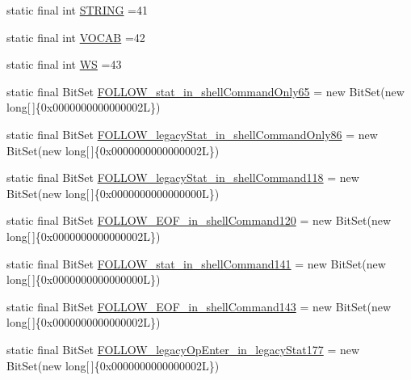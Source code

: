 \begin{DoxyCompactItemize}
\item 
static final int \hyperlink{classorg_1_1tzi_1_1use_1_1parser_1_1shell_1_1_shell_command_parser_a70f508f209903ea40e4a4db856532fbb}{S\-T\-R\-I\-N\-G} =41
\item 
static final int \hyperlink{classorg_1_1tzi_1_1use_1_1parser_1_1shell_1_1_shell_command_parser_a9ed513409bb5891111a4e8a40efe9fd0}{V\-O\-C\-A\-B} =42
\item 
static final int \hyperlink{classorg_1_1tzi_1_1use_1_1parser_1_1shell_1_1_shell_command_parser_ad1eb7f196e278698295abb130df5dfbe}{W\-S} =43
\item 
static final Bit\-Set \hyperlink{classorg_1_1tzi_1_1use_1_1parser_1_1shell_1_1_shell_command_parser_aa08586710d36bfb31548a1ab3a64ded7}{F\-O\-L\-L\-O\-W\-\_\-stat\-\_\-in\-\_\-shell\-Command\-Only65} = new Bit\-Set(new long\mbox{[}$\,$\mbox{]}\{0x0000000000000002\-L\})
\item 
static final Bit\-Set \hyperlink{classorg_1_1tzi_1_1use_1_1parser_1_1shell_1_1_shell_command_parser_a1e89ba05af7b3128bc0543138a00b9cc}{F\-O\-L\-L\-O\-W\-\_\-legacy\-Stat\-\_\-in\-\_\-shell\-Command\-Only86} = new Bit\-Set(new long\mbox{[}$\,$\mbox{]}\{0x0000000000000002\-L\})
\item 
static final Bit\-Set \hyperlink{classorg_1_1tzi_1_1use_1_1parser_1_1shell_1_1_shell_command_parser_ab569dae83257ad267233023bb8d452f1}{F\-O\-L\-L\-O\-W\-\_\-legacy\-Stat\-\_\-in\-\_\-shell\-Command118} = new Bit\-Set(new long\mbox{[}$\,$\mbox{]}\{0x0000000000000000\-L\})
\item 
static final Bit\-Set \hyperlink{classorg_1_1tzi_1_1use_1_1parser_1_1shell_1_1_shell_command_parser_adbcc648cdebed6c184bbb054c49141cb}{F\-O\-L\-L\-O\-W\-\_\-\-E\-O\-F\-\_\-in\-\_\-shell\-Command120} = new Bit\-Set(new long\mbox{[}$\,$\mbox{]}\{0x0000000000000002\-L\})
\item 
static final Bit\-Set \hyperlink{classorg_1_1tzi_1_1use_1_1parser_1_1shell_1_1_shell_command_parser_a82f24b9b4acd9c3663b2d84836950c9b}{F\-O\-L\-L\-O\-W\-\_\-stat\-\_\-in\-\_\-shell\-Command141} = new Bit\-Set(new long\mbox{[}$\,$\mbox{]}\{0x0000000000000000\-L\})
\item 
static final Bit\-Set \hyperlink{classorg_1_1tzi_1_1use_1_1parser_1_1shell_1_1_shell_command_parser_a0c1667176f02cf762d77d3553a3ec5e6}{F\-O\-L\-L\-O\-W\-\_\-\-E\-O\-F\-\_\-in\-\_\-shell\-Command143} = new Bit\-Set(new long\mbox{[}$\,$\mbox{]}\{0x0000000000000002\-L\})
\item 
static final Bit\-Set \hyperlink{classorg_1_1tzi_1_1use_1_1parser_1_1shell_1_1_shell_command_parser_afe5bcf0d9555f80f6fdf49e38c67168a}{F\-O\-L\-L\-O\-W\-\_\-legacy\-Op\-Enter\-\_\-in\-\_\-legacy\-Stat177} = new Bit\-Set(new long\mbox{[}$\,$\mbox{]}\{0x0000000000000002\-L\})

\end{DoxyCompactItemize}
